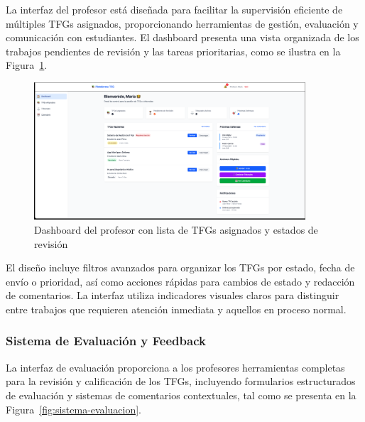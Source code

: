 \documentclass[12pt,a4paper,oneside]{report}
\begin{document}
La interfaz del profesor está diseñada para facilitar la supervisión eficiente de múltiples TFGs asignados, proporcionando herramientas de gestión, evaluación y comunicación con estudiantes. El dashboard presenta una vista organizada de los trabajos pendientes de revisión y las tareas prioritarias, como se ilustra en la Figura~\ref{fig:dashboard-profesor}.

\begin{figure}[H]
\centering
\includegraphics[width=0.9\textwidth]{processed/images/dashboard_profesor.png}
\caption{Dashboard del profesor con lista de TFGs asignados y estados de revisión}
\label{fig:dashboard-profesor}
\end{figure}

El diseño incluye filtros avanzados para organizar los TFGs por estado, fecha de envío o prioridad, así como acciones rápidas para cambios de estado y redacción de comentarios. La interfaz utiliza indicadores visuales claros para distinguir entre trabajos que requieren atención inmediata y aquellos en proceso normal.

\subsubsection{Sistema de Evaluación y Feedback}\label{sistema-de-evaluacion-y-feedback}

La interfaz de evaluación proporciona a los profesores herramientas completas para la revisión y calificación de los TFGs, incluyendo formularios estructurados de evaluación y sistemas de comentarios contextuales, tal como se presenta en la Figura~\ref{fig:sistema-evaluacion}.
\end{document}
